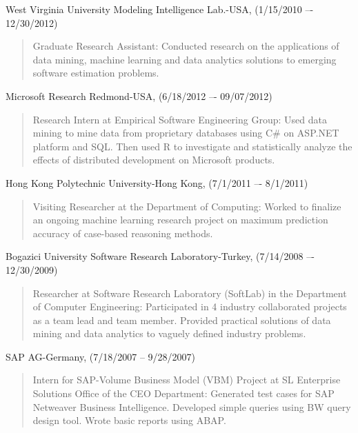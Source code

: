 \documentclass[margin]{res}
\begin{document}
\begin{resume}
\begin{list}{}{\leftmargin=0.5em}
\item West Virginia University Modeling Intelligence Lab.-USA, (1/15/2010 –- 12/30/2012) 
\begin{quote}
Graduate Research Assistant: Conducted research on the applications of data mining, machine learning and data analytics solutions to emerging software estimation problems.
\end{quote}

\item Microsoft Research Redmond-USA, (6/18/2012 –- 09/07/2012) 
\begin{quote}
Research Intern at Empirical Software Engineering Group: Used data mining to mine data from proprietary databases using C\# on ASP.NET platform and SQL. Then used R to investigate and statistically analyze the effects of distributed development on Microsoft products. 
\end{quote}

\item Hong Kong Polytechnic University-Hong Kong, (7/1/2011 –- 8/1/2011) 
\begin{quote}
Visiting Researcher at the Department of Computing: Worked to finalize an ongoing machine learning research project on maximum prediction accuracy of case-based reasoning methods.
\end{quote}

\item Bogazici University Software Research Laboratory-Turkey, (7/14/2008 –- 12/30/2009) 
\begin{quote}
Researcher at Software Research Laboratory (SoftLab) in the Department of Computer Engineering: Participated in 4 industry collaborated projects as a team lead and team member. Provided practical solutions of data mining and data analytics to vaguely defined industry problems.
\end{quote}


\item SAP AG-Germany, (7/18/2007 -- 9/28/2007) 
\begin{quote}
Intern for SAP-Volume Business Model (VBM) Project at SL Enterprise Solutions Office of the CEO Department: Generated test cases for SAP Netweaver Business Intelligence. Developed simple queries using BW query design tool. Wrote basic reports using ABAP.
\end{quote}


\end{list}
\end{resume}
\end{document}
